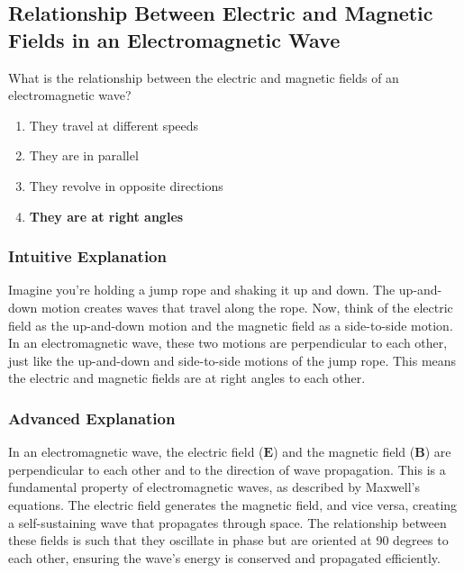 \subsection{Relationship Between Electric and Magnetic Fields in an Electromagnetic Wave}
\label{T3B01}

\begin{tcolorbox}[colback=gray!10!white,colframe=black!75!black,title=T3B01]
What is the relationship between the electric and magnetic fields of an electromagnetic wave?
\begin{enumerate}[noitemsep]
    \item They travel at different speeds
    \item They are in parallel
    \item They revolve in opposite directions
    \item \textbf{They are at right angles}
\end{enumerate}
\end{tcolorbox}

\subsubsection*{Intuitive Explanation}
Imagine you're holding a jump rope and shaking it up and down. The up-and-down motion creates waves that travel along the rope. Now, think of the electric field as the up-and-down motion and the magnetic field as a side-to-side motion. In an electromagnetic wave, these two motions are perpendicular to each other, just like the up-and-down and side-to-side motions of the jump rope. This means the electric and magnetic fields are at right angles to each other.

\subsubsection*{Advanced Explanation}
In an electromagnetic wave, the electric field (\(\mathbf{E}\)) and the magnetic field (\(\mathbf{B}\)) are perpendicular to each other and to the direction of wave propagation. This is a fundamental property of electromagnetic waves, as described by Maxwell's equations. The electric field generates the magnetic field, and vice versa, creating a self-sustaining wave that propagates through space. The relationship between these fields is such that they oscillate in phase but are oriented at 90 degrees to each other, ensuring the wave's energy is conserved and propagated efficiently.


